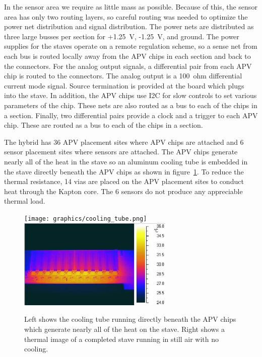 \documentclass[preprint,12pt]{elsarticle}
\begin{document}
In the sensor area we require as little mass as possible. Because of this, the sensor area has
only two routing layers, so careful routing was needed to optimize the power net
distribution and signal distribution. The power nets are distributed as three
large busses per section for +1.25~V, -1.25~V, and ground. The power supplies
for the staves operate on a remote regulation scheme, so a sense net from each bus is
routed locally away from the APV chips in each section and back to the
connectors. For
the analog output signals, a differential pair from each APV chip is routed to the
connectors. The analog output is a 100~ohm differential current mode signal. Source
termination is provided at the board which plugs into the stave. In addition,
the APV chips use I2C for slow controls to set various parameters of the chip.
These nets are also routed as a bus to each of the chips in a section. Finally,
two differential pairs provide a clock and a trigger to each APV chip. These
are routed as a bus to each of the chips in a section. 

The hybrid has 36 APV placement sites where APV chips are attached and 6 sensor
placement sites where sensors are attached. The APV chips generate nearly all of
the heat in the stave so an aluminum cooling tube is embedded in the stave
directly beneath the APV chips as shown in figure~\ref{fig:cooling_tube}. To reduce the thermal resistance, 14 vias are placed on the APV
placement sites to conduct heat through the Kapton core. The 6 sensors do not
produce any appreciable thermal load.

\begin{figure}[ht]
\begin{center}
\texttt{[image: graphics/cooling\_tube.png]}
\includegraphics[height=1.7in, keepaspectratio=true, angle=0]{graphics/apv_thermal.jpg}
\caption{Left shows the cooling tube running directly beneath the APV chips which generate nearly
all of the heat on the stave.  Right shows a thermal image of a completed stave
running in still air with no cooling.
\label{fig:cooling_tube}}
\end{center}
\end{figure}
%
\end{document}
